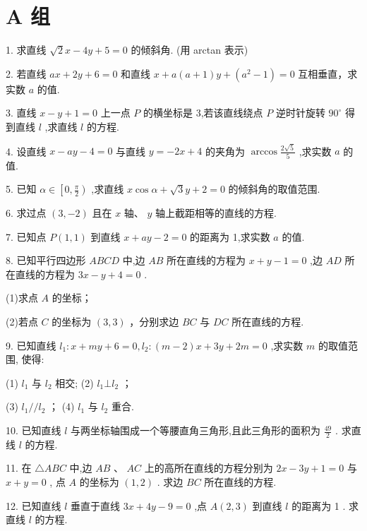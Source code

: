 \documentclass[10pt]{article}
\begin{document}
\section*{A 组}

1. 求直线 \(\sqrt{2}x - {4y} + 5 = 0\) 的倾斜角. (用 arctan 表示)

2. 若直线 \({ax} + {2y} + 6 = 0\) 和直线 \(x + a\left( {a + 1}\right) y + \left( {{a}^{2} - 1}\right)  = 0\) 互相垂直，求实数 \(a\) 的值.

3. 直线 \(x - y + 1 = 0\) 上一点 \(P\) 的横坐标是 3,若该直线绕点 \(P\) 逆时针旋转 \({90}^{ \circ  }\) 得到直线 \(l\) ,求直线 \(l\) 的方程.

4. 设直线 \(x - {ay} - 4 = 0\) 与直线 \(y =  - {2x} + 4\) 的夹角为 \(\arccos \frac{2\sqrt{5}}{5}\) ,求实数 \(a\) 的值.

5. 已知 \(\alpha  \in  \left\lbrack  {0,\frac{\pi }{2}}\right)\) ,求直线 \(x\cos \alpha  + \sqrt{3}y + 2 = 0\) 的倾斜角的取值范围.

6. 求过点 \(\left( {3, - 2}\right)\) 且在 \(x\) 轴、 \(y\) 轴上截距相等的直线的方程.

7. 已知点 \(P\left( {1,1}\right)\) 到直线 \(x + {ay} - 2 = 0\) 的距离为 1,求实数 \(a\) 的值.

8. 已知平行四边形 \({ABCD}\) 中,边 \({AB}\) 所在直线的方程为 \(x + y - 1 = 0\) ,边 \({AD}\) 所在直线的方程为 \({3x} - y + 4 = 0\) .

(1)求点 \(A\) 的坐标；

(2)若点 \(C\) 的坐标为 \(\left( {3,3}\right)\) ，分别求边 \({BC}\) 与 \({DC}\) 所在直线的方程.

9. 已知直线 \({l}_{1} : x + {my} + 6 = 0,{l}_{2} : \left( {m - 2}\right) x + {3y} + {2m} = 0\) ,求实数 \(m\) 的取值范围, 使得:

(1) \({l}_{1}\) 与 \({l}_{2}\) 相交; (2) \({l}_{1} \bot  {l}_{2}\) ；

(3) \({l}_{1}//{l}_{2}\) ； (4) \({l}_{1}\) 与 \({l}_{2}\) 重合.

10. 已知直线 \(l\) 与两坐标轴围成一个等腰直角三角形,且此三角形的面积为 \(\frac{49}{2}\) . 求直线 \(l\) 的方程.

11. 在 \(\bigtriangleup {ABC}\) 中,边 \({AB}\text{ 、 }{AC}\) 上的高所在直线的方程分别为 \({2x} - {3y} + 1 = 0\) 与 \(x + y = 0\) , 点 \(A\) 的坐标为 \(\left( {1,2}\right)\) . 求边 \({BC}\) 所在直线的方程.

12. 已知直线 \(l\) 垂直于直线 \({3x} + {4y} - 9 = 0\) ,点 \(A\left( {2,3}\right)\) 到直线 \(l\) 的距离为 1 . 求直线 \(l\) 的方程.
\end{document}

